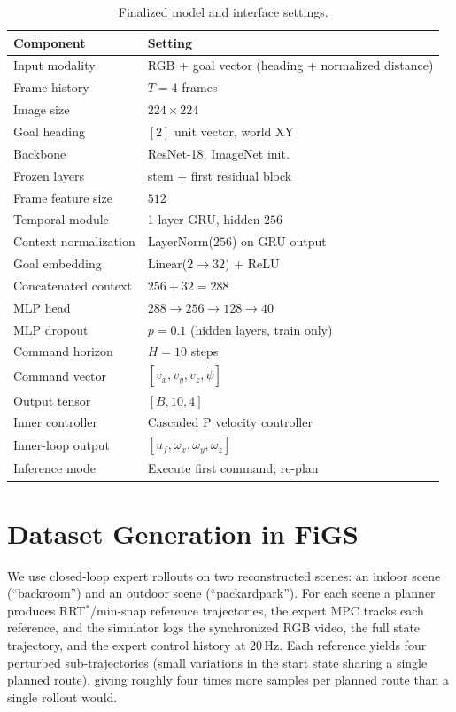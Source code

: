 \documentclass[10pt,twocolumn,letterpaper]{article}
\begin{document}
\begin{table}[t]
\centering
\caption{Finalized model and interface settings.}
\label{tab:params}
\small
\begin{tabular}{@{}ll@{}}
\toprule
\textbf{Component} & \textbf{Setting} \\
\midrule
Input modality & RGB + goal vector (heading + normalized distance) \\
Frame history & $T=4$ frames \\
Image size & $224\times224$ \\
Goal heading & $[2]$ unit vector, world XY \\
Backbone & ResNet-18, ImageNet init.\ \\
Frozen layers & stem + first residual block \\
Frame feature size & $512$ \\
Temporal module & 1-layer GRU, hidden $256$ \\
Context normalization & LayerNorm($256$) on GRU output \\
Goal embedding & Linear($2{\to}32$) + ReLU \\
Concatenated context & $256 + 32 = 288$ \\
MLP head & $288\!\to\!256\!\to\!128\!\to\!40$ \\
MLP dropout & $p=0.1$ (hidden layers, train only) \\
Command horizon & $H=10$ steps \\
Command vector & $[v_x, v_y, v_z, \dot{\psi}]$ \\
Output tensor & $[B,10,4]$ \\
Inner controller & Cascaded P velocity controller \\
Inner-loop output & $[u_f, \omega_x, \omega_y, \omega_z]$ \\
Inference mode & Execute first command; re-plan \\
\bottomrule
\end{tabular}
\end{table}

\section{Dataset Generation in FiGS}
\label{sec:data}

We use closed-loop expert rollouts on two reconstructed scenes: an indoor scene (``backroom'') and an outdoor scene (``packardpark''). For each scene a planner produces RRT$^{*}$/min-snap reference trajectories, the expert MPC tracks each reference, and the simulator logs the synchronized RGB video, the full state trajectory, and the expert control history at $20\,\mathrm{Hz}$. Each reference yields four perturbed sub-trajectories (small variations in the start state sharing a single planned route), giving roughly four times more samples per planned route than a single rollout would.
\end{document}
